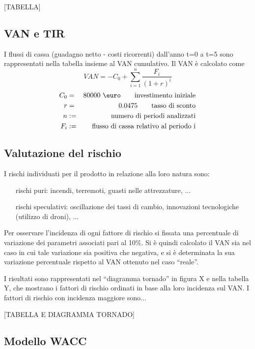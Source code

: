 [TABELLA]

\subsection{VAN e TIR}
I flussi di cassa (guadagno netto - costi ricorrenti) dall’anno t=0 a t=5 sono
rappresentati nella tabella insieme al VAN cumulativo.
Il VAN è calcolato come 	
\begin{displaymath}
VAN = - C_0 + \sum_{i=1}^n \frac{F_i}{(1 + r)^i}
\end{displaymath}
\begin{eqnarray*}
C_0 &=& 80000 \ \mbox{\euro} \qquad \mbox{investimento iniziale} \\
r &=& 0.0475 \qquad \mbox{tasso di sconto} \\
n &:=& \mbox{numero di periodi analizzati} \\
F_i &:=& \mbox{flusso di cassa relativo al periodo i}
\end{eqnarray*}

\subsection{Valutazione del rischio}
I rischi individuati per il prodotto in relazione alla loro natura sono:
\begin{itemize}
\item [rischi puri:] incendi, terremoti, guasti nelle attrezzature, ...
\item [rischi speculativi:] oscillazione dei tassi di cambio, innovazioni
tecnologiche (utilizzo di droni), ...
\end{itemize}

Per osservare l’incidenza di ogni fattore di rischio si fissata una
percentuale di variazione dei parametri associati pari al 10\%. Si è quindi
calcolato il VAN sia nel caso in cui tale variazione sia positiva che negativa,
e si è determinata la sua variazione percentuale rispetto al VAN ottenuto nel
caso “reale”.

I risultati sono rappresentati nel “diagramma tornado” in figura X e nella
tabella Y, che mostrano i fattori di rischio ordinati in base alla loro
incidenza sul VAN. I fattori di rischio con incidenza maggiore sono...

[TABELLA E DIAGRAMMA TORNADO]

\subsection{Modello WACC}

